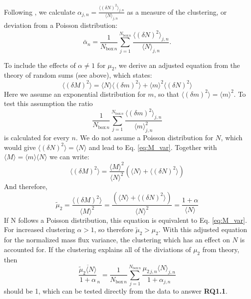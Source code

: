 \documentclass[a4paper, 12pt]{article}
\begin{document}
Following \cite{Davoudi2010}, we calculate $\alpha_{j,n} = \frac{\langle (\delta N)^2 \rangle_{j,n}}{\langle N \rangle_{j,n}}$ as a measure of the clustering, or deviation from a Poisson distribution:
\begin{equation} \label{eq:mean_alpha}
 \bar{\alpha}_n = \frac{1}{N_{\mathrm{box}\,n}} \sum_{j=1}^{N_{\mathrm{box}\,n}} \frac{\langle (\delta N)^2 \rangle_{j,n}}{\langle N \rangle_{j,n}}.
\end{equation}

To include the effects of $\alpha \neq 1$ for $\mu_2$, we derive an adjusted equation from the theory of random sums (see above), which states:
\begin{equation} \label{eq:derivation_1}
 \langle (\delta M)^2 \rangle = \langle N \rangle \langle (\delta m)^2 \rangle + \langle m \rangle^2 \langle (\delta N)^2 \rangle
\end{equation}
Here we assume an exponential distribution for $m$, so that $\langle (\delta m)^2 \rangle = \langle m \rangle^2$. To test this assumption the ratio
\begin{equation} \label{eq:m_exp_test}
 \frac{1}{N_{\mathrm{box}\,n}} \sum_{j=1}^{N_{\mathrm{box}\,n}} \frac{\langle (\delta m)^2 \rangle_{j,n}}{\langle m \rangle_{j,n}^2}
\end{equation}
is calculated for every $n$. We do not assume a Poisson distribution for $N$, which would give $\langle (\delta N)^2 \rangle = \langle N \rangle$ and lead to Eq. \ref{eq:M_var}. Together with $\langle M \rangle = \langle m \rangle \langle N \rangle$ we can write:
\begin{equation} \label{eq:derivation_2}
 \langle (\delta M)^2 \rangle = \frac{\langle M \rangle^2}{\langle N \rangle^2} (\langle N \rangle + \langle (\delta N)^2 \rangle)
\end{equation}
And therefore,
\begin{equation} \label{eq:adjusted_M_var}
 \tilde{\mu}_2 = \frac{\langle (\delta M)^2 \rangle}{\langle M \rangle^2} = \frac{(\langle N \rangle + \langle (\delta N)^2 \rangle)}{\langle N \rangle^2 } = \frac{1+\alpha}{\langle N \rangle}
\end{equation}
If N follows a Poisson distribution, this equation is equivalent to Eq. \ref{eq:M_var}. For increased clustering $\alpha>1$, so therefore $\tilde{\mu}_2 > \mu_2$. With this adjusted equation for the normalized mass flux variance, the clustering which has an effect on $N$ is accounted for. If the clustering explains all of the diviations of $\mu_2$ from theory, then 
\begin{equation} \label{eq:adjusted_M_var}
 \overline{\frac{\tilde{\mu}_2 \langle N \rangle}{1+\alpha}}_n = \frac{1}{N_{\mathrm{box}\,n}} \sum_{j=1}^{N_{\mathrm{box}\,n}} \frac{\mu_{2\,j,n}\langle N\rangle_{j,n}}{1 + \alpha_{j,n}}
\end{equation} 
should be 1, which can be tested directly from the data to answer \textbf{RQ1.1}.
\end{document}
